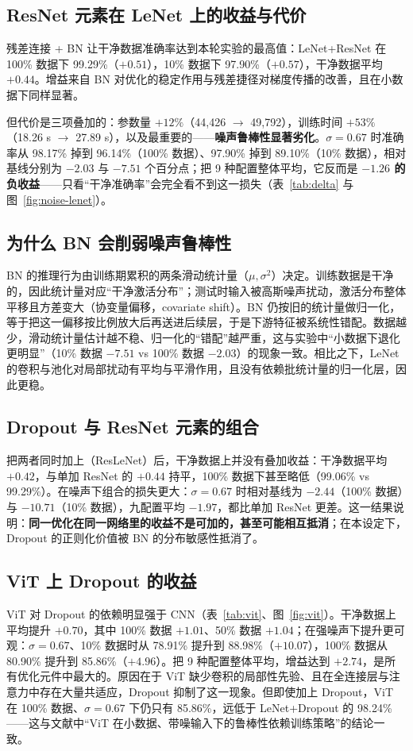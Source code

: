 \documentclass[12pt,hyperref,a4paper,UTF8]{ctexart}
\begin{document}
\subsection{ResNet 元素在 LeNet 上的收益与代价}
残差连接 + BN 让干净数据准确率达到本轮实验的最高值：LeNet+ResNet 在 100\% 数据下 99.29\%（$+0.51$），10\% 数据下 97.90\%（$+0.57$），干净数据平均 $+0.44$。增益来自 BN 对优化的稳定作用与残差捷径对梯度传播的改善，且在小数据下同样显著。

但代价是三项叠加的：参数量 $+12\%$（44{,}426 $\to$ 49{,}792），训练时间 $+53\%$（18.26 s $\to$ 27.89 s），以及最重要的——\textbf{噪声鲁棒性显著劣化}。$\sigma=0.67$ 时准确率从 98.17\% 掉到 96.14\%（100\% 数据）、97.90\% 掉到 89.10\%（10\% 数据），相对基线分别为 $-2.03$ 与 $-7.51$ 个百分点；把 9 种配置整体平均，它反而是 \textbf{$-1.26$ 的负收益}——只看“干净准确率”会完全看不到这一损失（表~\ref{tab:delta} 与图~\ref{fig:noise-lenet}）。

\subsection{为什么 BN 会削弱噪声鲁棒性}
BN 的推理行为由训练期累积的两条滑动统计量（$\mu,\sigma^2$）决定。训练数据是干净的，因此统计量对应“干净激活分布”；测试时输入被高斯噪声扰动，激活分布整体平移且方差变大（协变量偏移，covariate shift）。BN 仍按旧的统计量做归一化，等于把这一偏移按比例放大后再送进后续层，于是下游特征被系统性错配。数据越少，滑动统计量估计越不稳、归一化的“错配”越严重，这与实验中“小数据下退化更明显”（10\% 数据 $-7.51$ vs 100\% 数据 $-2.03$）的现象一致。相比之下，LeNet 的卷积与池化对局部扰动有平均与平滑作用，且没有依赖批统计量的归一化层，因此更稳。

\subsection{Dropout 与 ResNet 元素的组合}
把两者同时加上（ResLeNet）后，干净数据上并没有叠加收益：干净数据平均 $+0.42$，与单加 ResNet 的 $+0.44$ 持平，100\% 数据下甚至略低（99.06\% vs 99.29\%）。在噪声下组合的损失更大：$\sigma=0.67$ 时相对基线为 $-2.44$（100\% 数据）与 $-10.71$（10\% 数据），九配置平均 $-1.97$，都比单加 ResNet 更差。这一结果说明：\textbf{同一优化在同一网络里的收益不是可加的，甚至可能相互抵消}；在本设定下，Dropout 的正则化价值被 BN 的分布敏感性抵消了。

\subsection{ViT 上 Dropout 的收益}
ViT 对 Dropout 的依赖明显强于 CNN（表~\ref{tab:vit}、图~\ref{fig:vit}）。干净数据上平均提升 $+0.70$，其中 100\% 数据 $+1.01$、50\% 数据 $+1.04$；在强噪声下提升更可观：$\sigma=0.67$、10\% 数据时从 78.91\% 提升到 88.98\%（$+10.07$），100\% 数据从 80.90\% 提升到 85.86\%（$+4.96$）。把 9 种配置整体平均，增益达到 $+2.74$，是所有优化元件中最大的。原因在于 ViT 缺少卷积的局部性先验、且在全连接层与注意力中存在大量共适应，Dropout 抑制了这一现象。但即使加上 Dropout，ViT 在 100\% 数据、$\sigma=0.67$ 下仍只有 85.86\%，远低于 LeNet+Dropout 的 98.24\%——这与文献中“ViT 在小数据、带噪输入下的鲁棒性依赖训练策略”的结论一致\cite{bai2021transformers}。
\end{document}
